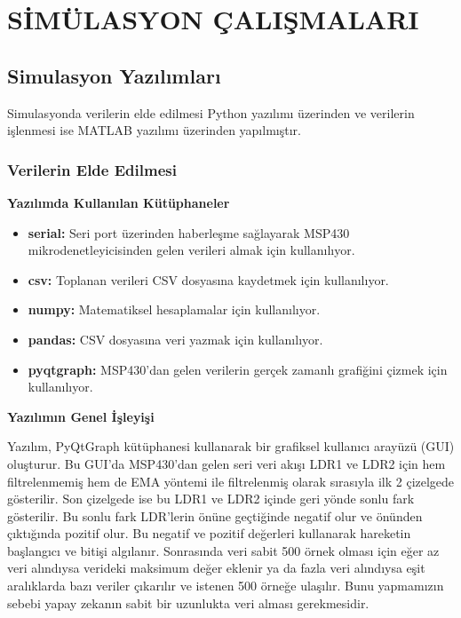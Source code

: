 \section{SİMÜLASYON ÇALIŞMALARI}


\subsection{Simulasyon Yazılımları}

Simulasyonda verilerin elde edilmesi Python yazılımı üzerinden ve verilerin işlenmesi ise MATLAB yazılımı üzerinden yapılmıştır.

\subsubsection{Verilerin Elde Edilmesi}


\textbf{Yazılımda Kullanılan Kütüphaneler}

\begin{itemize}
    \item \textbf{serial:} Seri port üzerinden haberleşme sağlayarak MSP430 mikrodenetleyicisinden gelen verileri almak için kullanılıyor.
    \item \textbf{csv:} Toplanan verileri CSV dosyasına kaydetmek için kullanılıyor.
    \item \textbf{numpy:} Matematiksel hesaplamalar için kullanılıyor.
    \item \textbf{pandas:} CSV dosyasına veri yazmak için kullanılıyor.
    \item \textbf{pyqtgraph:} MSP430'dan gelen verilerin gerçek zamanlı grafiğini çizmek için kullanılıyor.
\end{itemize}

\textbf{Yazılımın Genel İşleyişi}

Yazılım, PyQtGraph kütüphanesi kullanarak bir grafiksel kullanıcı arayüzü (GUI) oluşturur. Bu GUI'da MSP430'dan gelen seri veri akışı LDR1 ve LDR2 için hem filtrelenmemiş hem de EMA yöntemi ile filtrelenmiş olarak sırasıyla ilk 2 çizelgede gösterilir. Son çizelgede ise bu LDR1 ve LDR2 içinde geri yönde sonlu fark gösterilir. Bu sonlu fark LDR'lerin önüne geçtiğinde negatif olur ve önünden çıktığında pozitif olur. Bu negatif ve pozitif değerleri kullanarak hareketin başlangıcı ve bitişi algılanır. Sonrasında veri sabit 500 örnek olması için eğer az veri alındıysa verideki maksimum değer eklenir ya da fazla veri alındıysa eşit aralıklarda bazı veriler çıkarılır ve istenen 500 örneğe ulaşılır. Bunu yapmamızın sebebi yapay zekanın sabit bir uzunlukta veri alması gerekmesidir.

